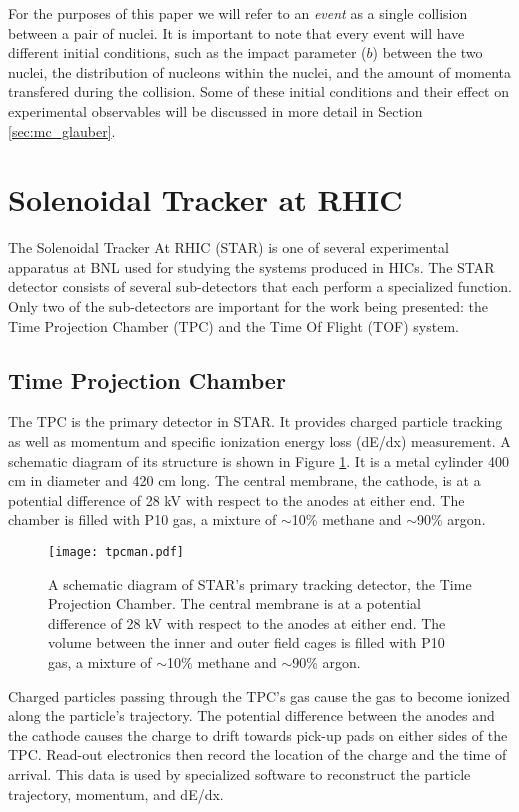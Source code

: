 	For the purposes of this paper we will refer to an \textit{event} as a single collision between a pair of nuclei. It is important to note that every event will have different initial conditions, such as the impact parameter ($b$) between the two nuclei, the distribution of nucleons within the nuclei, and the amount of momenta transfered during the collision. Some of these initial conditions and their effect on experimental observables will be discussed in more detail in Section \ref{sec:mc_glauber}. 


\section{Solenoidal Tracker at RHIC}
	\label{sec:star}
	The Solenoidal Tracker At RHIC (STAR) is one of several experimental apparatus at BNL used for studying the systems produced in HICs. The STAR detector consists of several sub-detectors that each perform a specialized function. Only two of the sub-detectors are important for the work being presented: the Time Projection Chamber (TPC) and the Time Of Flight (TOF) system. 

	\subsection{ Time Projection Chamber }
		The TPC is the primary detector in STAR. It provides charged particle tracking as well as momentum and specific ionization energy loss (dE/dx) measurement. A schematic diagram of its structure is shown in Figure \ref{fig:tpcman}. It is a metal cylinder 400 cm in diameter and 420 cm long. The central membrane, the cathode, is at a potential difference of 28 kV with respect to the anodes at either end. The chamber is filled with P10 gas, a mixture of $\sim$10\% methane and $\sim$90\% argon\cite{anderson_star_2003}. 

		\begin{figure}
			\centering 
			\texttt{[image: tpcman.pdf]} 
			 
			\caption{ \label{fig:tpcman} A schematic diagram of STAR's primary tracking detector, the Time Projection Chamber. The central membrane is at a potential difference of 28 kV with respect to the anodes at either end. The volume between the inner and outer field cages is filled with P10 gas, a mixture of $\sim$10\% methane and $\sim$90\% argon\cite{anderson_star_2003}. } 
		\end{figure}

		Charged particles passing through the TPC's gas cause the gas to become ionized along the particle's trajectory. The potential difference between the anodes and the cathode causes the charge to drift towards pick-up pads on either sides of the TPC. Read-out electronics then record the location of the charge and the time of arrival. This data is used by specialized software to reconstruct the particle trajectory, momentum, and dE/dx.

